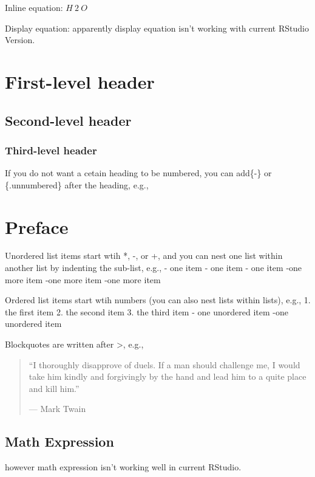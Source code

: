 \documentclass[]{article}
\begin{document}
Inline equation: \(H~2~O\)

Display equation: apparently display equation isn't working with current
RStudio Version.

\section{First-level header}\label{first-level-header}

\subsection{Second-level header}\label{second-level-header}

\subsubsection{Third-level header}\label{third-level-header}

If you do not want a cetain heading to be numbered, you can add\{-\} or
\{.unnumbered\} after the heading, e.g.,

\section*{Preface}\label{preface}

Unordered list items start wtih *, -, or +, and you can nest one list
within another list by indenting the sub-list, e.g., - one item - one
item - one item -one more item -one more item -one more item

Ordered list items start wtih numbers (you can also nest lists within
lists), e.g., 1. the first item 2. the second item 3. the third item -
one unordered item -one unordered item

Blockquotes are written after \textgreater{}, e.g.,

\begin{quote}
``I thoroughly disapprove of duels. If a man should challenge me, I
would take him kindly and forgivingly by the hand and lead him to a
quite place and kill him.''

--- Mark Twain
\end{quote}

\subsection{Math Expression}\label{math-expression}

however math expression isn't working well in current RStudio.
\end{document}
